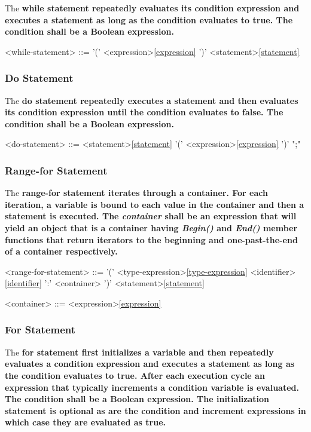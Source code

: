 \documentclass[a4paper,oneside,11pt]{article}
\begin{document}
The \bf{while} statement repeatedly evaluates its condition expression and executes a statement as long as the condition evaluates to \bf{true}.
The condition shall be a Boolean expression.

\begin{grammar}
\label{while-statement}<while-statement> ::=  '(' <expression>\ref{expression} ')' <statement>\ref{statement}
\end{grammar}

\subsubsection{Do Statement}

The \bf{do} statement repeatedly executes a statement and then evaluates its condition expression until the condition evaluates to \bf{false}.
The condition shall be a Boolean expression.

\begin{grammar}
\label{do-statement}<do-statement> ::=  <statement>\ref{statement}  '(' <expression>\ref{expression} ')' ";"
\end{grammar}

\subsubsection{Range-for Statement}
The \bf{range-for} statement iterates through a container.
For each iteration, a variable is bound to each value in the container and then a statement is executed.
The \emph{container} shall be an expression that will yield an object that is a container having \emph{Begin()} and \emph{End()} member functions
that return iterators to the beginning and one-past-the-end of a container respectively.

\begin{grammar}
\label{range-for-statement}<range-for-statement> ::=  '(' <type-expression>\ref{type-expression} <identifier>\ref{identifier} ':' <container> ')' <statement>\ref{statement}

<container> ::= <expression>\ref{expression}
\end{grammar}

\subsubsection{For Statement}

The \bf{for} statement first initializes a variable and then
repeatedly evaluates a condition expression and executes a statement as long as the condition evaluates to \bf{true}.
After each execution cycle an expression that typically increments a condition variable is evaluated.
The condition shall be a Boolean expression.
The initialization statement is optional as are the condition and increment expressions in which case they are evaluated as \bf{true}.
\end{document}

